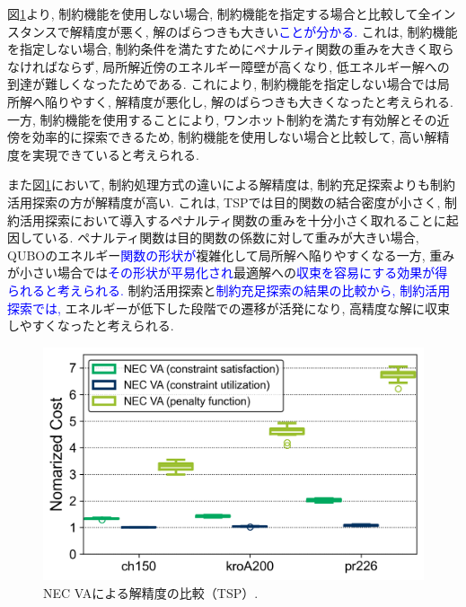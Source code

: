 \documentclass[submit,techrep,noauthor]{ipsj}
\begin{document}
図\ref{Cost_TSP_VA}より, 制約機能を使用しない場合, 制約機能を指定する場合と比較して全インスタンスで解精度が悪く, 解のばらつきも大きい\textcolor{blue}{ことが分かる.} これは, 制約機能を指定しない場合, 制約条件を満たすためにペナルティ関数の重みを大きく取らなければならず, 局所解近傍のエネルギー障壁が高くなり, 低エネルギー解への到達が難しくなったためである. これにより, 制約機能を指定しない場合では局所解へ陥りやすく, 解精度が悪化し, 解のばらつきも大きくなったと考えられる.
一方, 制約機能を使用することにより, ワンホット制約を満たす有効解とその近傍を効率的に探索できるため, 制約機能を使用しない場合と比較して, 高い解精度を実現できていると考えられる.

また図\ref{Cost_TSP_VA}において, 制約処理方式の違いによる解精度は, 制約充足探索よりも制約活用探索の方が解精度が高い. これは, TSPでは目的関数の結合密度が小さく, 制約活用探索において導入するペナルティ関数の重みを十分小さく取れることに起因している. ペナルティ関数は目的関数の係数に対して重みが大きい場合, QUBOのエネルギー\textcolor{blue}{関数の形状が}複雑化して局所解へ陥りやすくなる一方, 重みが小さい場合では\textcolor{blue}{その形状が平易化され}最適解への\textcolor{blue}{収束を容易にする効果が得られると考えられる.} 制約活用探索と\textcolor{blue}{制約充足探索の結果の比較から, 制約活用探索では, }エネルギーが低下した段階での遷移が活発になり, 高精度な解に収束しやすくなったと考えられる.


\begin{figure}[tb]
\centering
\includegraphics[bb=0 0 700 230, width=15cm]{Cost_TSP_VA.png}
\caption{NEC VAによる解精度の比較（TSP）.}
\label{Cost_TSP_VA}
\end{figure}
\end{document}
